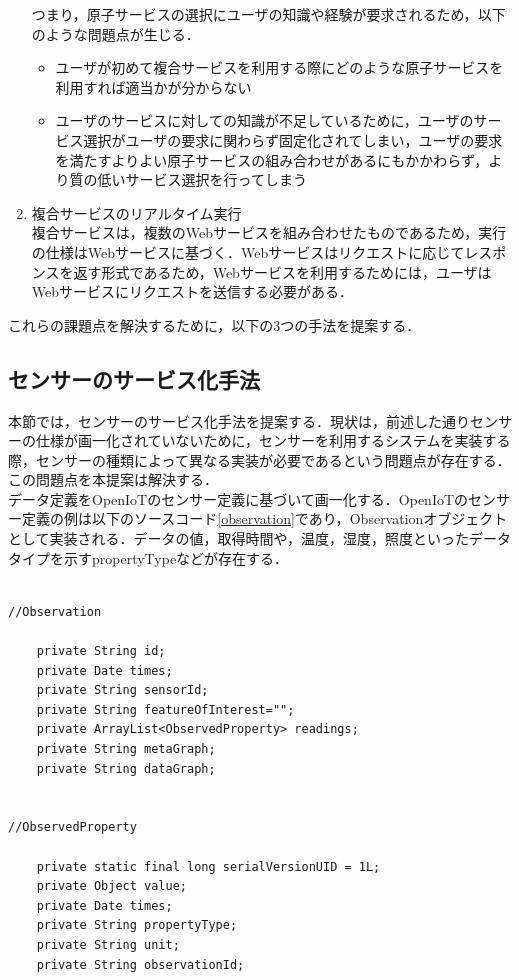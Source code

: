 \documentclass{kuisthesis}			%
\begin{document}
\begin{enumerate}
つまり，原子サービスの選択にユーザの知識や経験が要求されるため，以下のような問題点が生じる．
\begin{itemize}
\item ユーザが初めて複合サービスを利用する際にどのような原子サービスを利用すれば適当かが分からない
\item ユーザのサービスに対しての知識が不足しているために，ユーザのサービス選択がユーザの要求に関わらず固定化されてしまい，ユーザの要求を満たすよりよい原子サービスの組み合わせがあるにもかかわらず，より質の低いサービス選択を行ってしまう
\end{itemize}
\item 複合サービスのリアルタイム実行\\
複合サービスは，複数のWebサービスを組み合わせたものであるため，実行の仕様はWebサービスに基づく．Webサービスはリクエストに応じてレスポンスを返す形式であるため，Webサービスを利用するためには，ユーザはWebサービスにリクエストを送信する必要がある．
\end{enumerate}
これらの課題点を解決するために，以下の3つの手法を提案する．

\subsection{センサーのサービス化手法}
本節では，センサーのサービス化手法を提案する．現状は，前述した通りセンサーの仕様が画一化されていないために，センサーを利用するシステムを実装する際，センサーの種類によって異なる実装が必要であるという問題点が存在する．この問題点を本提案は解決する．
\\
データ定義をOpenIoTのセンサー定義に基づいて画一化する．OpenIoTのセンサー定義の例は以下のソースコード\ref{observation}であり，Observationオブジェクトとして実装される．データの値，取得時間や，温度，湿度，照度といったデータタイプを示すpropertyTypeなどが存在する．\\
\\
\begin{lstlisting}[caption=センサー定義例,label=observation]
//Observation

	private String id;	
	private Date times;	
	private String sensorId;
	private String featureOfInterest=""; 
	private ArrayList<ObservedProperty> readings;
	private String metaGraph;
	private String dataGraph;
	
	
//ObservedProperty

	private static final long serialVersionUID = 1L;
	private Object value;
	private Date times;
	private String propertyType;
	private String unit;
	private String observationId;
\end{lstlisting}
\end{document}
